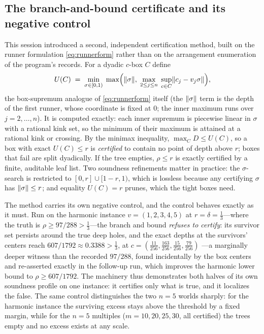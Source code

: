 \subsection{The branch-and-bound certificate and its negative control}
\label{sec:bb}

This session introduced a second, independent certification method,
built on the runner formulation \eqref{eq:runnerform} rather than on
the arrangement enumeration of the program's records. For a dyadic
$c$-box $C$ define
\[
U(C)\;=\;\min_{\sigma\in[0,1)}\;
\max\Bigl(\lVert \sigma \rVert,\;\max_{2\le j\le n}\;
\sup_{c\in C}\lVert c_j-v_j\sigma \rVert\Bigr),
\]
the box-supremum analogue of \eqref{eq:runnerform} itself (the
$\lVert \sigma \rVert$ term is the depth of the first runner, whose coordinate is
fixed at $0$; the inner maximum runs over $j=2,\dots,n$). It is
computed exactly: each inner supremum is piecewise linear in $\sigma$
with a rational kink set, so the minimum of their maximum is attained at
a rational kink or crossing. By the minimax inequality,
$\max_C D\le U(C)$, so a box with exact $U(C)\le r$ is \emph{certified}
to contain no point of depth above $r$; boxes that fail are split
dyadically. If the tree empties, $\rho\le r$ is exactly certified by a
finite, auditable leaf list. Two soundness refinements matter in
practice: the $\sigma$-search is restricted to
$[0,r]\cup[1-r,1)$, which is lossless because any certifying $\sigma$
has $\lVert \sigma \rVert\le r$; and equality $U(C)=r$ prunes, which the tight
boxes need.

The method carries its own negative control, and the control behaves
exactly as it must. Run on the harmonic instance $v=(1,2,3,4,5)$ at
$r=\delta=\tfrac13$---where the truth is $\rho\ge97/288>\tfrac13$---the
branch and bound \emph{refuses to certify}: its survivor set persists
around the true deep holes, and the exact depths at the survivors'
centers reach $607/1792\approx0.3388>\tfrac13$, at
$c=(\tfrac{11}{256},\tfrac{163}{256},\tfrac{15}{256},\tfrac{79}{256})$
---a marginally deeper witness than the recorded $97/288$, found
incidentally by the box centers and re-asserted exactly in the follow-up
run, which improves the harmonic lower bound to $\rho\ge607/1792$. The machinery thus demonstrates both halves of its own
soundness profile on one instance: it certifies only what is true, and
it localizes the false. The same control distinguishes the two
$n=5$ worlds sharply: for the harmonic instance the surviving excess
stays above the threshold by a fixed margin, while for the $n=5$
multiples ($m=10,20,25,30$, all certified) the trees empty and no
excess exists at any scale.

